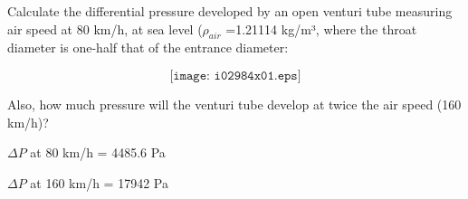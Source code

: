 

Calculate the differential pressure developed by an open venturi tube measuring air speed at 80 km/h, at sea level ($\rho_{air}$ =1.21114 kg/m³, where the throat diameter is one-half that of the entrance diameter:

$$\texttt{[image: i02984x01.eps]}$$

Also, how much pressure will the venturi tube develop at twice the air speed (160 km/h)?








$\Delta P$ at 80 km/h = 4485.6 Pa 
\vskip 10pt

$\Delta P$ at 160 km/h =  17942 Pa










